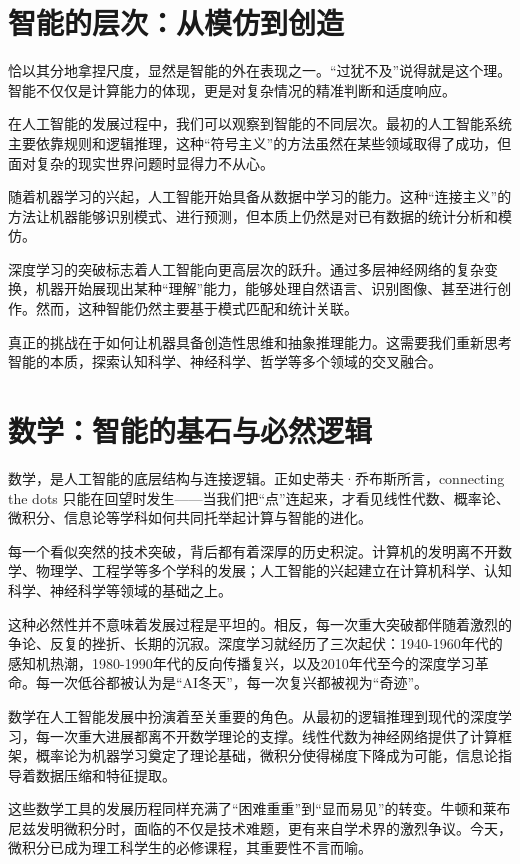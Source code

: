 \section{智能的层次：从模仿到创造}

恰以其分地拿捏尺度，显然是智能的外在表现之一。“过犹不及”说得就是这个理。智能不仅仅是计算能力的体现，更是对复杂情况的精准判断和适度响应。

在人工智能的发展过程中，我们可以观察到智能的不同层次。最初的人工智能系统主要依靠规则和逻辑推理，这种“符号主义”的方法虽然在某些领域取得了成功，但面对复杂的现实世界问题时显得力不从心。

随着机器学习的兴起，人工智能开始具备从数据中学习的能力。这种“连接主义”的方法让机器能够识别模式、进行预测，但本质上仍然是对已有数据的统计分析和模仿。

深度学习的突破标志着人工智能向更高层次的跃升。通过多层神经网络的复杂变换，机器开始展现出某种“理解”能力，能够处理自然语言、识别图像、甚至进行创作。然而，这种智能仍然主要基于模式匹配和统计关联。

真正的挑战在于如何让机器具备创造性思维和抽象推理能力。这需要我们重新思考智能的本质，探索认知科学、神经科学、哲学等多个领域的交叉融合。

\section{数学：智能的基石与必然逻辑}

数学，是人工智能的底层结构与连接逻辑。正如史蒂夫·乔布斯所言，connecting the dots 只能在回望时发生——当我们把“点”连起来，才看见线性代数、概率论、微积分、信息论等学科如何共同托举起计算与智能的进化。

每一个看似突然的技术突破，背后都有着深厚的历史积淀。计算机的发明离不开数学、物理学、工程学等多个学科的发展；人工智能的兴起建立在计算机科学、认知科学、神经科学等领域的基础之上。

这种必然性并不意味着发展过程是平坦的。相反，每一次重大突破都伴随着激烈的争论、反复的挫折、长期的沉寂。深度学习就经历了三次起伏：1940-1960年代的感知机热潮，1980-1990年代的反向传播复兴，以及2010年代至今的深度学习革命。每一次低谷都被认为是“AI冬天”，每一次复兴都被视为“奇迹”。

数学在人工智能发展中扮演着至关重要的角色。从最初的逻辑推理到现代的深度学习，每一次重大进展都离不开数学理论的支撑。线性代数为神经网络提供了计算框架，概率论为机器学习奠定了理论基础，微积分使得梯度下降成为可能，信息论指导着数据压缩和特征提取。

这些数学工具的发展历程同样充满了“困难重重”到“显而易见”的转变。牛顿和莱布尼兹发明微积分时，面临的不仅是技术难题，更有来自学术界的激烈争议。今天，微积分已成为理工科学生的必修课程，其重要性不言而喻。

